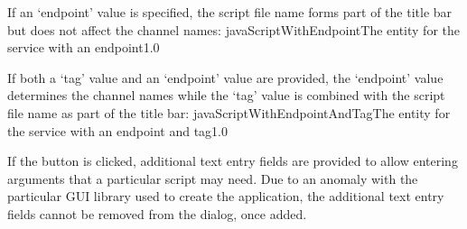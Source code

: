 If an `endpoint' value is specified, the script file name forms part of the title bar but
does not affect the channel names:
%
{javaScriptWithEndpoint}{The \emph{\MMMU} entity for the \emph{\JSIO} service with an
endpoint}{1.0}

If both a `tag' value and an `endpoint' value are provided, the `endpoint' value
determines the channel names while the `tag' value is combined with the script file name
as part of the title bar:
%
{javaScriptWithEndpointAndTag}{The \emph{\MMMU} entity for the \emph{\JSIO} service with
an endpoint and tag}{1.0}

If the  button is clicked, additional text entry fields are
provided to allow entering arguments that a particular script may need.
\openSq{}Due to an anomaly with the particular GUI library used to create the
\emph{\MMMU} application, the additional text entry fields cannot be removed from the
dialog, once added.\closeSq{}
\secondaryEnd
\primaryEnd{}
